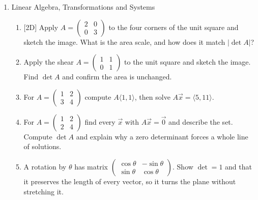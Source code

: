\documentclass[12pt]{article}
\newcommand{\dimtag}[1]{{\footnotesize\textsc{[#1]}}\;}
\begin{document}
\begin{enumerate}
\item Linear Algebra, Transformations and Systems
    \begin{enumerate}
        \item \dimtag{2D} Apply $A=\begin{pmatrix}2&0\\0&3\end{pmatrix}$ to the four corners of the unit square and sketch the image. What is the area scale, and how does it match $|\det A|$?
        \item Apply the shear $A=\begin{pmatrix}1&1\\0&1\end{pmatrix}$ to the unit square and sketch the image. Find $\det A$ and confirm the area is unchanged.
        \item For $A=\begin{pmatrix}1&2\\3&4\end{pmatrix}$ compute $A\langle 1,1\rangle$, then solve $A\vec x=\langle 5,11\rangle$.
        \item For $A=\begin{pmatrix}1&2\\2&4\end{pmatrix}$ find every $\vec x$ with $A\vec x=\vec 0$ and describe the set. Compute $\det A$ and explain why a zero determinant forces a whole line of solutions.
        \item A rotation by $\theta$ has matrix $\begin{pmatrix}\cos\theta&-\sin\theta\\\sin\theta&\cos\theta\end{pmatrix}$. Show $\det=1$ and that it preserves the length of every vector, so it turns the plane without stretching it.
    \end{enumerate}
\bigskip


\end{enumerate}
\end{document}
